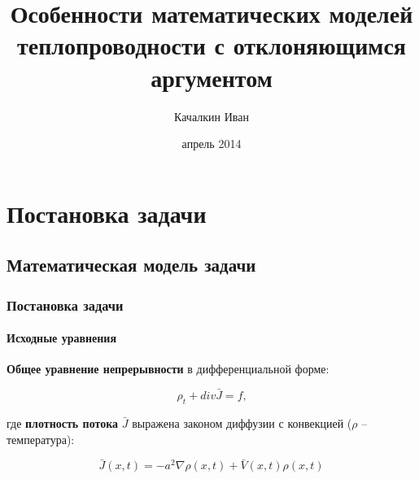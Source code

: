 \documentclass{beamer}
\numberwithin{equation}{section}
\begin{document}
    
    \title{Особенности математических моделей теплопроводности с отклоняющимся аргументом}
    
    \author{Качалкин Иван}
    
    
    \date{апрель 2014}

    {
        \frame{\titlepage}
    }

    \section{Постановка задачи}
    \subsection{Математическая модель задачи}
    \begin{frame}
        \frametitle{Постановка задачи}
        \framesubtitle{Исходные уравнения}

        \textbf{Общее уравнение непрерывности} в дифференциальной форме:

        \begin{equation}
            \rho_t + div \bar{J} = f \text{,}
        \end{equation}

        где \textbf{плотность потока} $\bar{J}$ выражена законом диффузии с конвекцией ($\rho$ \--- температура):

        \begin{equation}
            \bar{J}(x,t) = -a^2 \nabla \rho(x,t) + \bar{V}(x,t) \rho(x,t)
        \end{equation}

    \end{frame}
\end{document}
